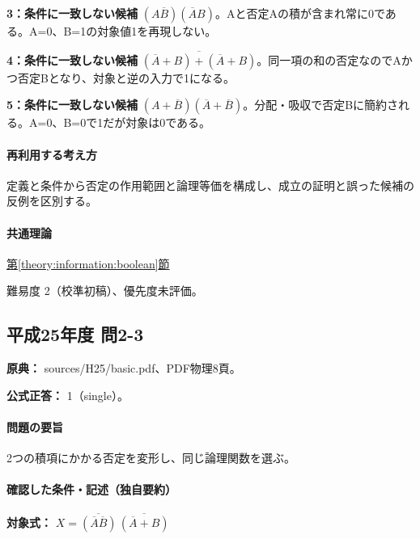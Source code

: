 \noindent\textbf{3：条件に一致しない候補} \((A\overline B)(\overline A B)\)。Aと否定Aの積が含まれ常に0である。A=\allowbreak{}0、B=\allowbreak{}1の対象値1を再現しない。\par

\noindent\textbf{4：条件に一致しない候補} \(\overline{(\overline A+B)+(\overline A+B)}\)。同一項の和の否定なのでAかつ否定Bとなり、対象と逆の入力で1になる。\par

\noindent\textbf{5：条件に一致しない候補} \((A+\overline B)(\overline A+\overline B)\)。分配・吸収で否定Bに簡約される。A=\allowbreak{}0、B=\allowbreak{}0で1だが対象は0である。\par

\paragraph{再利用する考え方} 定義と条件から否定の作用範囲と論理等価を構成し、成立の証明と誤った候補の反例を区別する。

\paragraph{共通理論} \hyperref[theory:information:boolean]{第\ref*{theory:information:boolean}節}

\par 難易度 2（校準初稿）、優先度未評価。

\subsection{平成25年度 問2-3}
\label{q:h25-reg-basic-2-3}

\noindent\textbf{原典：} sources/H25/basic.pdf、PDF物理8頁。

\textbf{公式正答：} 1（single）。

\paragraph{問題の要旨} 2つの積項にかかる否定を変形し、同じ論理関数を選ぶ。

\paragraph{確認した条件・記述（独自要約）}\mbox{}\par

\noindent\textbf{対象式：} \(X=\overline{(\overline A\overline B)}\,\overline{(\overline A+B)}\)\par

